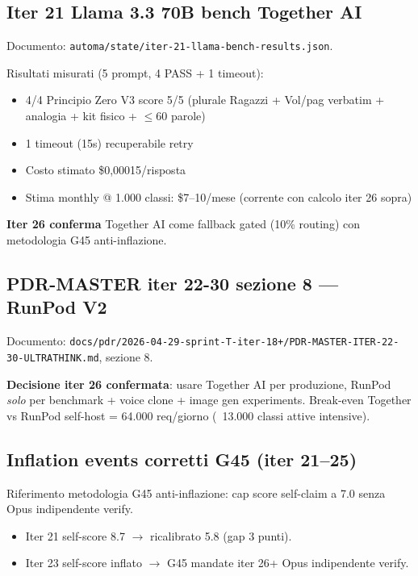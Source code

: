 \documentclass[12pt,a4paper]{article}
\begin{document}
\subsection{Iter 21 Llama 3.3 70B bench Together AI}

Documento: \texttt{automa/state/iter-21-llama-bench-results.json}.

Risultati misurati (5 prompt, 4 PASS + 1 timeout):
\begin{itemize}[leftmargin=*]
  \item 4/4 Principio Zero V3 score 5/5 (plurale Ragazzi + Vol/pag verbatim + analogia + kit fisico + $\leq 60$ parole)
  \item 1 timeout (15s) recuperabile retry
  \item Costo stimato \$0,00015/risposta
  \item Stima monthly @ 1.000 classi: \$7--10/mese (corrente con calcolo iter 26 sopra)
\end{itemize}

\textbf{Iter 26 conferma} Together AI come fallback gated (10\% routing) con metodologia G45 anti-inflazione.

\subsection{PDR-MASTER iter 22-30 sezione 8 --- RunPod V2}

Documento: \texttt{docs/pdr/2026-04-29-sprint-T-iter-18+/PDR-MASTER-ITER-22-30-ULTRATHINK.md}, sezione 8.

\textbf{Decisione iter 26 confermata}: usare Together AI per produzione, RunPod \emph{solo} per benchmark + voice clone + image gen experiments. Break-even Together vs RunPod self-host = 64.000 req/giorno (~13.000 classi attive intensive).

\subsection{Inflation events corretti G45 (iter 21--25)}

Riferimento metodologia G45 anti-inflazione: cap score self-claim a 7.0 senza Opus indipendente verify.

\begin{itemize}
  \item Iter 21 self-score 8.7 $\rightarrow$ ricalibrato 5.8 (gap 3 punti).
  \item Iter 23 self-score inflato $\rightarrow$ G45 mandate iter 26+ Opus indipendente verify.
\end{itemize}
\end{document}
